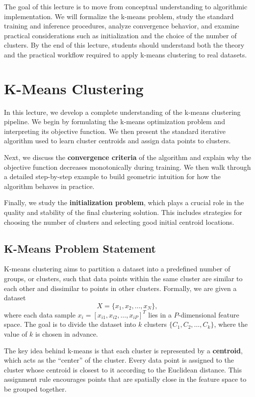 \documentclass{article}
\begin{document}
The goal of this lecture is to move from conceptual understanding to algorithmic
implementation. We will formalize the k-means problem, study the standard
training and inference procedures, analyze convergence behavior, and examine
practical considerations such as initialization and the choice of the number of
clusters. By the end of this lecture, students should understand both the theory
and the practical workflow required to apply k-means clustering to real datasets.

\section{K-Means Clustering}

In this lecture, we develop a complete understanding of the k-means clustering
pipeline. We begin by formulating the k-means optimization problem and
interpreting its objective function. We then present the standard iterative
algorithm used to learn cluster centroids and assign data points to clusters.

Next, we discuss the \textbf{convergence criteria} of the algorithm and explain
why the objective function decreases monotonically during training. We then walk
through a detailed step-by-step example to build geometric intuition for how the
algorithm behaves in practice.

Finally, we study the \textbf{initialization problem}, which plays a crucial role
in the quality and stability of the final clustering solution. This includes
strategies for choosing the number of clusters and selecting good initial
centroid locations.


\subsection{K-Means Problem Statement}

K-means clustering aims to partition a dataset into a predefined number of
groups, or clusters, such that data points within the same cluster are similar
to each other and dissimilar to points in other clusters. Formally, we are given
a dataset
\[
X=\{x_1,x_2,\ldots,x_N\},
\]
where each data sample $x_i=[x_{i1},x_{i2},\ldots,x_{iP}]^T$ lies in a
$P$-dimensional feature space. The goal is to divide the dataset into $k$
clusters $\{C_1,C_2,\ldots,C_k\}$, where the value of $k$ is chosen in advance.

The key idea behind k-means is that each cluster is represented by a
\textbf{centroid}, which acts as the “center” of the cluster. Every data point is
assigned to the cluster whose centroid is closest to it according to the
Euclidean distance. This assignment rule encourages points that are spatially
close in the feature space to be grouped together.
\end{document}
